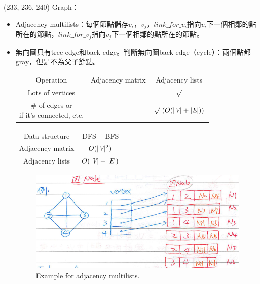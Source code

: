 \item \begin{theorem}{(233, 236, 240)} Graph：\begin{itemize}
        \item Adjacency multilists：每個節點儲存$v_i$，$v_j$，$link\_for\_v_i$指向$v_i$下一個相鄰的點所在的節點，$link\_for\_v_j$指向$v_j$下一個相鄰的點所在的節點。%
        \item 無向圖只有tree edge和back edge。判斷無向圖back edge（cycle）：兩個點都gray，但是不為父子節點。
        \begin{table}[H]
            \centering
            \begin{tabular}{|c|c|c|}
                \hline
                Operation & Adjacency matrix & Adjacency lists \\
                \Xhline{2\arrayrulewidth}
                Lots of vertices & & $\surd$ \\
                \hline
                \makecell{\# of edges or \\if it's connected, etc.} & & $\surd \ (O(|\V| + |\E|))$ \\
                \hline
            \end{tabular}
        \end{table}
        \begin{table}[H]
            \centering
            \begin{tabular}{|c|c|c|}
                \hline
                Data structure & DFS & BFS \\
                \Xhline{2\arrayrulewidth}
                Adjacency matrix & \multicolumn{2}{c|}{$O(|\textit{V}|^2)$} \\
                \hline
                Adjacency lists & \multicolumn{2}{c|}{$O(|\textit{V}| + |\textit{E}|)$} \\
                \hline
            \end{tabular}
        \end{table}
        \begin{figure}[H]
            \centering
            \includegraphics[scale=0.8]{img/adj_multilists.png}
            \caption{Example for adjacency multilists.}
            \label{img:adj_multilists}
        \end{figure}
    \end{itemize}
\end{theorem}

